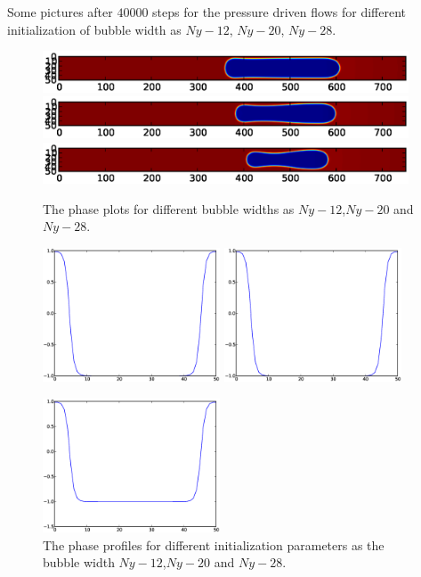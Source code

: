 \documentclass{article}
\begin{document}
Some pictures after $40000$ steps for the pressure driven flows for different
initialization of bubble width as $Ny-12$, $Ny-20$, $Ny-28$.
\begin{figure}
\includegraphics*[bb=18 350 594 450,
width=0.97\textwidth]{Figures/pressure_width_6.eps}
\includegraphics*[bb=18 350 594 450,
width=0.97\textwidth]{Figures/pressure_width_10.eps}
\includegraphics*[bb=18 350 594 450,
width=0.97\textwidth]{Figures/pressure_width_14.eps}
\caption{The phase plots for different bubble widths as $Ny-12$,$Ny-20$ and
$Ny-28$.}
\end{figure}
\begin{figure}
\includegraphics[width=0.47\textwidth]{Figures/plane_pressure_width_6.eps}
\includegraphics[width=0.47\textwidth]{Figures/plane_pressure_width_10.eps}
\begin{center}
\includegraphics[width=0.47\textwidth]{Figures/plane_pressure_width_14.eps}
\end{center}
\caption{The phase profiles for different initialization parameters as the
bubble width $Ny-12$,$Ny-20$ and $Ny-28$.
\label{fig:phase:profiles:different:widths:pressure}}
\end{figure}
\end{document}
